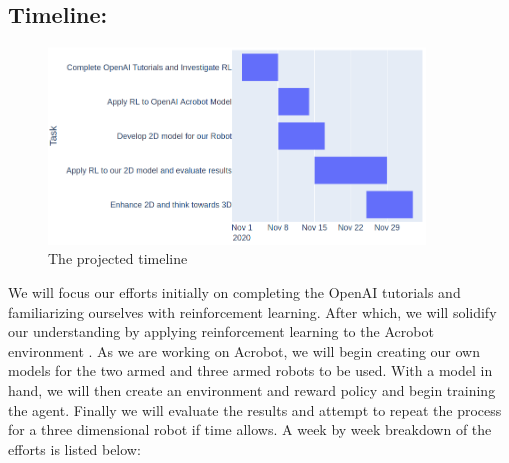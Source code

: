 \documentclass{article}
\begin{document}
\subsection{Timeline:} 
\begin{figure}[htp]
    \centering
    \includegraphics[width=10cm]{Project_timeline.png}
    \caption{The projected timeline}
    \label{fig:timeline}
\end{figure}
We will focus our efforts initially on completing the OpenAI tutorials and familiarizing ourselves with reinforcement learning. After which, we will solidify our understanding by applying reinforcement learning to the Acrobot environment \cite{acrobot}. As we are working on Acrobot, we will begin creating our own models for the two armed and three armed robots to be used. With a model in hand, we will then create an environment and reward policy and begin training the agent. Finally we will evaluate the results and attempt to repeat the process for a three dimensional robot if time allows. A week by week breakdown of the efforts is listed below:\\
\end{document}
